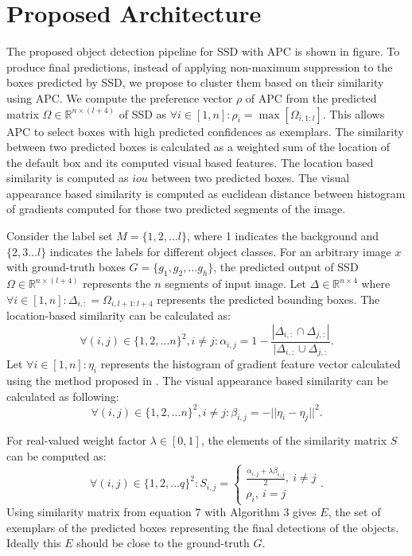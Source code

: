 \documentclass[conference]{IEEEtran}
\begin{document}
\section{Proposed Architecture}
The proposed object detection pipeline for SSD with APC is shown in figure. To produce final predictions, instead of applying non-maximum suppression to the boxes predicted by SSD, we propose to cluster them based on their similarity using APC. We compute the preference vector $\rho$ of APC from the predicted matrix $\Omega \in \mathbb{R}^{n \times (l+4)}$ of SSD as $\forall i \in [1,n] : \rho_i = \max[\Omega_{i,1:l}]$. This allows APC to select boxes with high predicted confidences as exemplars. The similarity between two predicted boxes is calculated as a weighted sum of the location of the default box and its computed visual based features. The location based similarity is computed as $iou$ between two predicted boxes. The visual appearance based similarity is computed as euclidean distance between histogram of gradients \cite{dalal2005histograms} computed for those two predicted segments of the image. 

Consider the label set $M = \{1, 2, ... l\}$, where 1 indicates the background and  $\{2, 3 ... l\}$ indicates the labels for different object classes. For an arbitrary image $x$ with ground-truth boxes $G = \{g_1, g_2, ... g_h\}$, the predicted output of SSD $\Omega \in \mathbb{R}^{n \times (l + 4)}$ represents the $n$ segments of input image. Let $\Delta \in \mathbb{R}^{n \times 4}$ where $\forall i \in [1, n] : \Delta_{i,:} = \Omega_{i, l+1:l+4}$ represents the predicted bounding boxes. The location-based similarity can be calculated as: 
\begin{equation}
\forall (i, j) \in \{1, 2, ... n\}^2, i \neq j  : \alpha_{i,j} = 1 - \frac{|\Delta_{i,:} \cap \Delta_{j,:}|}{|\Delta_{i,:} \cup \Delta_{j,:}}.\end{equation}
Let $\forall i \in [1,n] : \eta_i$ represents the histogram of gradient feature vector calculated using the method proposed in \cite{dalal2005histograms}. The visual appearance based similarity can be calculated as following:
\begin{equation}
\forall (i, j) \in \{1, 2, ... n\}^2, i \neq j  : \beta_{i, j} = - ||\eta_i - \eta_j||^2.
\end{equation}

For real-valued weight factor $\lambda \in [0,1]$, the elements of the similarity matrix $S$ can be computed as: 
\begin{equation}
\forall (i, j) \in \{1, 2, ... q\}^2  : S_{i,j} = \begin{cases}\frac{\alpha_{i,j} + \lambda \beta_{i,j}}{2},\ i \neq j\\
        					\rho_i,\ i = j
        		\end{cases}.
\end{equation}
Using similarity matrix from equation 7 with Algorithm 3 gives $E$, the set of exemplars of the  predicted boxes representing the final detections of the objects. Ideally this $E$ should be close to the ground-truth $G$.
\end{document}
